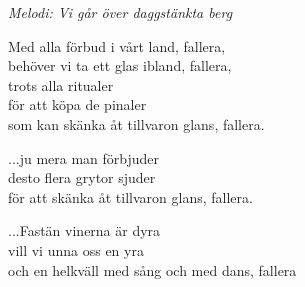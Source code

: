 {\footnotesize\textit{Melodi: Vi går över daggstänkta berg}}\par
\vspace{10pt}
Med alla förbud i vårt land, fallera,\\
behöver vi ta ett glas ibland, fallera,\\
trots alla ritualer\\
för att köpa de pinaler\\
som kan skänka åt tillvaron glans, fallera.\par
\vspace{10pt}
...ju mera man förbjuder\\
desto flera grytor sjuder\\
för att skänka åt tillvaron glans, fallera.\par
\vspace{10pt}
...Fastän vinerna är dyra\\
vill vi unna oss en yra\\
och en helkväll med sång och med dans, fallera
